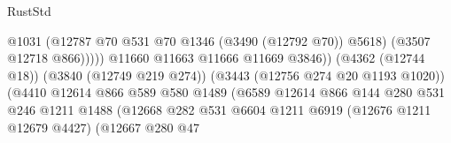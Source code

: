 \begin{lexlean}{RustStd}
\begin{coremodule}
{\begin{coremodule}
{{{{{{{{{{{{{{{{{{{{{{{{{{                                                            @1031
                                                            (@12787
                                                              @70
                                                              @531
                                                              @70
                                                              @1346
                                                              (@3490 (@12792 @70))
                                                              @5618)
                                                            (@3507 @12718 @866)))))
                                                    @11660
                                                    @11663
                                                    @11666
                                                    @11669
                                                    @3846))
                                                (@4362 (@12744 @18))
                                                (@3840 (@12749 @219 @274))
                                                (@3443 (@12756 @274 @20 @1193 @1020))
                                                (@4410
                                                  @12614
                                                  @866
                                                  @589
                                                  @580
                                                  @1489
                                                  (@6589
                                                    @12614
                                                    @866
                                                    @144
                                                    @280
                                                    @531
                                                    @246
                                                    @1211
                                                    @1488
                                                    (@12668
                                                      @282
                                                      @531
                                                      @6604
                                                      @1211
                                                      @6919
                                                      (@12676 @1211 @12679 @4427)
                                                      (@12667
                                                        @280
                                                        @47
}}}}}}}}}}}}}}}}}}}}}}}}}}
\end{coremodule}}
\end{coremodule}
\end{lexlean}
